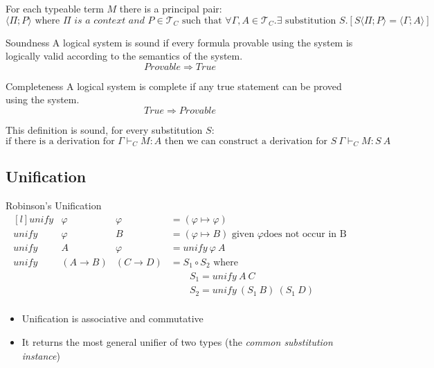 For each typeable term $M$ there is a principal pair:
\[\langle \Pi ; P \rangle \text{ where } \Pi \textit{ is a context and } P \in \mathcal{T}_C \text{ such that } \forall \Gamma, A \in \mathcal{T}_C . \exists \text{ substitution }S . [S \langle \Pi ; P \rangle = \langle \Gamma; A \rangle]\]

\begin{tcbraster}[raster columns=2,raster equal height]
    \begin{definitionbox}{Soundness}
        A logical system is sound if every formula provable using the system is logically valid according to the semantics of the system.
        \[Provable \Rightarrow True\]
    \end{definitionbox}
    \begin{definitionbox}{Completeness}
        A logical system is complete if any true statement can be proved using the system.
        \[True \Rightarrow Provable\]
    \end{definitionbox}
\end{tcbraster}

This definition is sound, for every substitution $S$:
\[\text{if there is a derivation for } \Gamma \vdash_C M : A \text{ then we can  construct a derivation for } S \ \Gamma \vdash_C M : S \ A\]


\subsection{Unification}

\begin{definitionbox}{Robinson's Unification}
    \[\begin{matrix*}[l]
        unify & \varphi & \varphi & = (\varphi \mapsto \varphi) \\
        unify & \varphi & B & = (\varphi \mapsto B)  \text{ given } \varphi \text{does not occur in B} \\
        unify & A & \varphi & = unify \ \varphi \ A \\
        unify &(A \to B) & (C \to D) & = S_1 \circ S_2 \text{ where} \\
        & & & \qquad S_1 = unify \ A \ C \\
        & & & \qquad S_2 = unify \ (S_1 \ B) \ (S_1 \ D)\\
    \end{matrix*}\]
    \begin{itemize}
        \item Unification is associative and commutative
        \item It returns the most general unifier of two types (the \textit{common substitution instance})
    \end{itemize}
\end{definitionbox}

